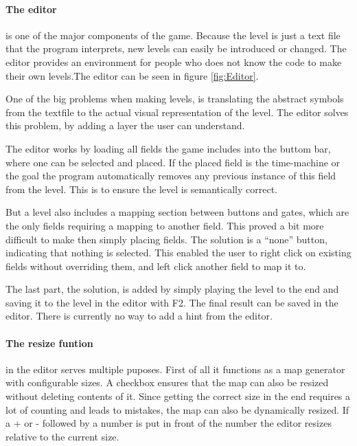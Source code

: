 \paragraph{The editor} is one of the major components of the game.
Because the level is just a text file that the program interprets, new
levels can easily be introduced or changed. The editor provides an
environment for people who does not know the code to make their own
levels.The editor can be seen in figure \ref{fig:Editor}.

One of the big problems when making levels, is translating the abstract
symbols from the textfile to the actual visual representation of the level.
The editor solves this problem, by adding a layer the user can understand.

The editor works by loading all fields the game includes into the
buttom bar, where one can be selected and placed. If the placed field
is the time-machine or the goal the program automatically removes any
previous instance of this field from the level.  This is to ensure the
level is semantically correct.

But a level also includes a mapping section between buttons and gates,
which are the only fields requiring a mapping to another field. This
proved a bit more difficult to make then simply placing fields. The
solution is a ``none'' button, indicating that nothing is
selected. This enabled the user to right click on existing fields
without overriding them, and left click another field to map it to.

The last part, the solution, is added by simply playing the level to the end
and saving it to the level in the editor with F2. The final result can be saved
in the editor. There is currently no way to add a hint from the editor.

\paragraph{The resize funtion} in the editor serves multiple puposes. First
of all it functions as a map generator with configurable sizes. A checkbox
ensures that the map can also be resized without deleting contents of it.
Since getting the correct size in the end requires a lot of counting and leads
to mistakes, the map can also be dynamically resized. If a + or - followed
by a number is put in front of the number the editor resizes relative to the
current size.

